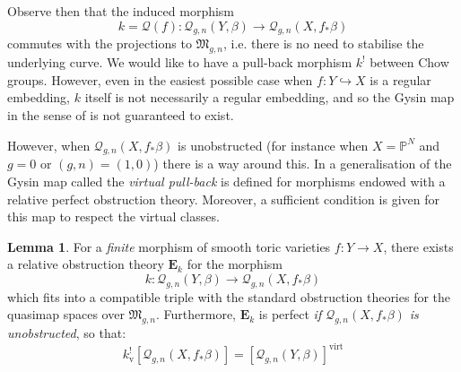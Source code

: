 \documentclass[11pt]{amsart}
\newcommand{\Q}[4]{\mathcal{Q}_{#1,#2}(#3,#4)}
\newcommand{\PP}{\mathbb P}
\renewcommand{\to}{\rightarrow}
\newcommand{\EE}{\mathbf{E}}
\newcommand{\MM}{\mathfrak M}
\newcommand{\virt}[1]{[#1]^{\operatorname{virt}}}
\newcommand{\om}[1]{\mathcal{#1}}
\theoremstyle{definition}
\newtheorem{lem}[thm]{Lemma}
\theoremstyle{definition}
\newcommand{\ilemph}[1]{\emph{#1}}
\begin{document}
Observe then that the induced morphism $$k=\om{Q}(f) \colon \Q{g}{n}{Y}{\beta} \to \Q{g}{n}{X}{f_* \beta}$$ commutes with the projections to $\mathfrak M_{g,n}$, i.e. there is no need to stabilise the underlying curve. We would like to have a pull-back morphism $k^!$ between Chow groups. However, even in the easiest possible case when $f \colon Y \hookrightarrow X$ is a regular embedding, $k$ itself is not necessarily a regular embedding, and so the Gysin map in the sense of \cite{FUL} is not guaranteed to exist.

However, when $\Q{g}{n}{X}{f_* \beta}$ is unobstructed (for instance when $X=\PP^N$ and $g=0$ or $(g,n)=(1,0)$) there is a way around this. In \cite{Manolache-Pull} a generalisation of the Gysin map called the \ilemph{virtual pull-back} is defined for morphisms endowed with a relative perfect obstruction theory. Moreover, a sufficient condition is given \cite[Corollary 4.9]{Manolache-Pull} for this map to respect the virtual classes.

\begin{lem} \label{Exists relative POT} For a \emph{finite} morphism of smooth toric varieties $f\colon Y\to X$, there exists a relative obstruction theory $\EE_k$ for the morphism
\begin{equation*} k : \Q{g}{n}{Y}{\beta} \to \Q{g}{n}{X}{f_*\beta} \end{equation*}
which fits into a compatible triple with the standard obstruction theories for the quasimap spaces over $\MM_{g,n}$. Furthermore, $\EE_k$ is perfect \emph{if $\Q{g}{n}{X}{f_*\beta}$ is unobstructed}, so that:
\begin{equation*} k^!_{\operatorname{v}} [ \Q{g}{n}{X}{f_*\beta} ] = \virt{\Q{g}{n}{Y}{\beta}} \end{equation*} \end{lem}
\end{document}

